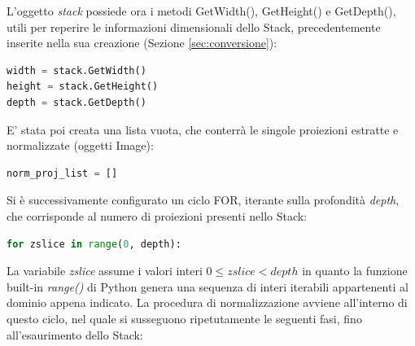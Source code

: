 \documentclass[a4paper,12pt, doubleside]{report}
\begin{document}
                L'oggetto \textit{stack} possiede ora i metodi GetWidth(), GetHeight() e GetDepth(), utili per reperire le informazioni dimensionali dello Stack, precedentemente inserite nella sua creazione (Sezione \ref{sec:conversione}):
                \begin{lstlisting}[language=python, frame=bt]
width = stack.GetWidth()
height = stack.GetHeight()
depth = stack.GetDepth()
                \end{lstlisting} 
                
                E' stata poi creata una lista vuota, che conterrà le singole proiezioni estratte e normalizzate (oggetti Image):
                \begin{lstlisting}[language=python, frame=bt]
norm_proj_list = []
                \end{lstlisting}
                
                Si è successivamente configurato un ciclo FOR, iterante sulla profondità \textit{depth}, che corrisponde al numero di proiezioni presenti nello Stack:
                \begin{lstlisting}[language=python, frame=bt]
for zslice in range(0, depth):
                \end{lstlisting} 

                La variabile \textit{zslice} assume i valori interi $0 \leq zslice < depth$ in quanto la funzione built-in \textit{range()} \cite{python-range} di Python genera una sequenza di interi iterabili appartenenti al dominio appena indicato. La procedura di normalizzazione avviene all'interno di questo ciclo, nel quale si susseguono ripetutamente le seguenti fasi, fino all'esaurimento dello Stack:
                
\end{document}
